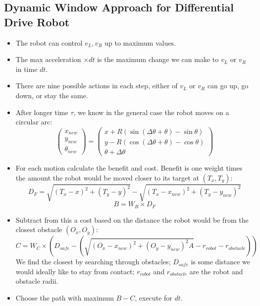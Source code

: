 \documentclass[11pt]{article}
\begin{document}
\subsection{Dynamic Window Approach for Differential Drive Robot}
\begin{itemize}
  \item The robot can control $v_L, v_R$ up to maximum values.
  \item The max acceleration $\times dt$ is the maximum change we can make to $v_L$ or $v_R$ in time $dt$.
  \item There are nine possible actions in each step, either of $v_L$ or $v_R$ can go up, go down, or stay the same.
  \item After longer time $\tau$, we know in the general case the robot moves on a circular arc:
    \[
      \begin{pmatrix}
        x_{new} \\
        y_{new} \\
        \theta_{new}
      \end{pmatrix}
      =
      \begin{pmatrix}
        x + R(\sin(\Delta\theta + \theta) - \sin\theta) \\
        y - R(\cos(\Delta\theta + \theta) - \cos\theta) \\
        \theta + \Delta\theta
      \end{pmatrix}
    \]
  \item For each motion calculate the benefit and cost.
    Benefit is one weight times the amount the robot would be moved closer to its target at $(T_x, T_y)$:
    \[
      D_F = \sqrt{(T_x - x)^2 + (T_y - y)^2} - \sqrt{(T_x - x_{new})^2 + (T_y - y_{new})^2} 
    \]
    \[
      B = W_B \times D_F
    \]
  \item Subtract from this a cost based on the distance the robot would be from the closest obstacle $(O_x, O_y)$:
    \[
      C = W_C \times (D_{safe} - (\sqrt{(O_x - x_{new})^2 + (O_y - y_{new})^2A} - r_{robot} - r_{obstacle}))
    \]
    We find the closest by searching through obstacles; $D_{safe}$ is some distance we would ideally like to stay from contact; $r_{robot}$ and $r_{obstacle}$ are the robot and obstacle radii.
  \item Choose the path with maximum $B - C$, execute for $dt$.
\end{itemize}
\end{document}
